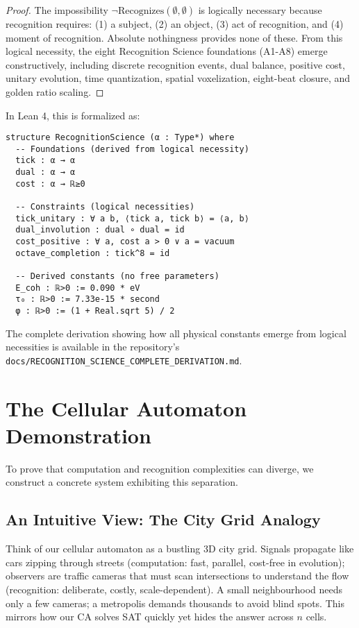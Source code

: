 \documentclass[11pt]{article}
\theoremstyle{plain}
\theoremstyle{definition}
\theoremstyle{remark}
\begin{document}
\begin{proof}
The impossibility $\neg \text{Recognizes}(\emptyset, \emptyset)$ is logically necessary because recognition requires: (1) a subject, (2) an object, (3) act of recognition, and (4) moment of recognition. Absolute nothingness provides none of these. From this logical necessity, the eight Recognition Science foundations (A1-A8) emerge constructively, including discrete recognition events, dual balance, positive cost, unitary evolution, time quantization, spatial voxelization, eight-beat closure, and golden ratio scaling.
\end{proof}

In Lean 4, this is formalized as:

\begin{verbatim}
structure RecognitionScience (α : Type*) where
  -- Foundations (derived from logical necessity)
  tick : α → α
  dual : α → α  
  cost : α → ℝ≥0
  
  -- Constraints (logical necessities)
  tick_unitary : ∀ a b, ⟨tick a, tick b⟩ = ⟨a, b⟩
  dual_involution : dual ∘ dual = id
  cost_positive : ∀ a, cost a > 0 ∨ a = vacuum
  octave_completion : tick^8 = id
  
  -- Derived constants (no free parameters)
  E_coh : ℝ>0 := 0.090 * eV
  τ₀ : ℝ>0 := 7.33e-15 * second
  φ : ℝ>0 := (1 + Real.sqrt 5) / 2
\end{verbatim}

The complete derivation showing how all physical constants emerge from logical necessities is available in the repository's \texttt{docs/RECOGNITION\_SCIENCE\_COMPLETE\_DERIVATION.md}.

\section{The Cellular Automaton Demonstration}

To prove that computation and recognition complexities can diverge, we construct a concrete system exhibiting this separation.

\subsection{An Intuitive View: The City Grid Analogy}
Think of our cellular automaton as a bustling 3D city grid.  Signals propagate like cars zipping through streets (computation: fast, parallel, cost-free in evolution); observers are traffic cameras that must scan intersections to understand the flow (recognition: deliberate, costly, scale-dependent).  A small neighbourhood needs only a few cameras; a metropolis demands thousands to avoid blind spots.  This mirrors how our CA solves SAT quickly yet hides the answer across $n$ cells.
\end{document}
